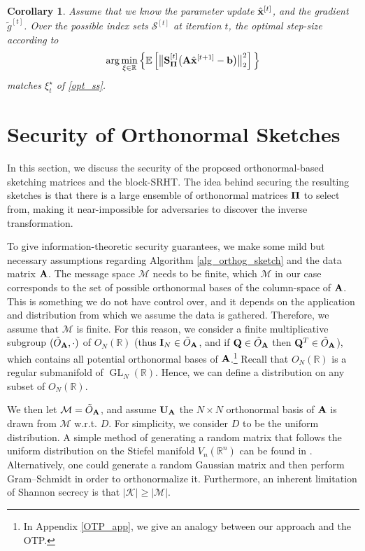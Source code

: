 \documentclass[journal,letterpaper,onecolumn,twoside,nofonttune]{IEEEtran}
\newcommand{\K}{\mathcal{K}}
\newcommand{\M}{\mathcal{M}}
\newcommand{\Qb}{\bold{Q}}
\newcommand{\Otil}{\tilde{O}}
\newcommand{\Ub}{\bold{U}}
\newcommand{\xbh}{{\hat{\bold{x}}}}
\newcommand{\Pibold}{\bold{\Pi}}
\newcommand{\Scal}{\mathcal{S}}
\newcommand{\R}{\mathbb{R}}
\newcommand{\E}{\mathbb{E}}
\newcommand{\gt}{\tilde{g}}
\newcommand{\Sb}{\bold{S}}
\newcommand{\SbPi}{\Sb_{\Pibold}}
\newcommand{\Ab}{\bold{A}}
\newcommand{\bb}{\bold{b}}
\newcommand{\Ib}{\bold{I}}
\DeclareMathOperator{\GL}{GL}
\newtheorem{Cor}{Corollary}
\begin{document}
\begin{Cor}
\label{cor_opt_ss}
  Assume that we know the parameter update $\xbh^{[t]}$, and the gradient $\gt^{[t]}$. Over the possible index sets $\Scal^{[t]}$ at iteration $t$, the optimal step-size according to
  \begin{equation*}
  \label{opt_exp_ss}
    \arg\min_{\xi\in\R}\Big\{\E\left[\big\|\SbPi^{[t]}\big(\Ab\xbh^{[t+1]}-\bb\big)\big\|_2^2\right]\Big\}
  \end{equation*}
  matches $\xi_t^{\star}$ of \eqref{opt_ss}.
\end{Cor}

\section{Security of Orthonormal Sketches}
\label{security_sec}

In this section, we discuss the security of the proposed orthonormal-based sketching matrices and the block-SRHT. The idea behind securing the resulting sketches is that there is a large ensemble of orthonormal matrices $\Pibold$ to select from, making it near-impossible for adversaries to discover the inverse transformation.

To give information-theoretic security guarantees, we make some mild but necessary assumptions regarding Algorithm \ref{alg_orthog_sketch} and the data matrix $\Ab$. The message space $\M$ needs to be finite, which $\M$ in our case corresponds to the set of possible orthonormal bases of the column-space of $\Ab$. This is something we do not have control over, and it depends on the application and distribution from which we assume the data is gathered. Therefore, we assume that $\M$ is finite. For this reason, we consider a finite multiplicative subgroup $(\Otil_\Ab,\cdot)$ of $O_N(\R)$ (thus $\Ib_N\in\Otil_\Ab$, and if $\Qb\in\Otil_\Ab$ then $\Qb^T\in\Otil_\Ab$), which contains all potential orthonormal bases of $\Ab$.\footnote{In Appendix \ref{OTP_app}, we give an analogy between our approach and the OTP.} Recall that $O_N(\R)$ is a regular submanifold of $\GL_N(\R)$. Hence, we can define a distribution on any subset of $O_N(\R)$.

We then let $\M=\Otil_\Ab$, and assume $\Ub_\Ab$ the $N\times N$ orthonormal basis of $\Ab$ is drawn from $\M$ w.r.t. $D$. For simplicity, we consider $D$ to be the uniform distribution. A simple method of generating a random matrix that follows the uniform distribution on the Stiefel manifold $V_n(\R^n)$ can be found in \cite[Theorem 2.2.1]{Yas12}. Alternatively, one could generate a random Gaussian matrix and then perform Gram–Schmidt in order to orthonormalize it. Furthermore, an inherent limitation of Shannon secrecy is that $|\K|\geqslant|\M|$.
\end{document}
